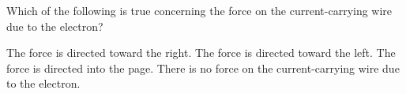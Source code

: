 \documentclass{../../oss-apphys-exam}
\begin{document}
\begin{multicols*}{2}
\begin{questions}
\begin{choices}
      \choice
    \end{choices}
    \vspace{.7in}
    
    \question Which of the following is true concerning the force on the
    current-carrying wire due to the electron?
    \begin{center}
    \end{center}
    \begin{choices}
      \choice The force is directed toward the right.
      \choice The force is directed toward the left.
      \choice The force is directed into the page.
      \choice There is no force on the current-carrying wire due to the
      electron.
    \end{choices}
    \columnbreak
    

\end{questions}
\end{multicols*}
\end{document}
